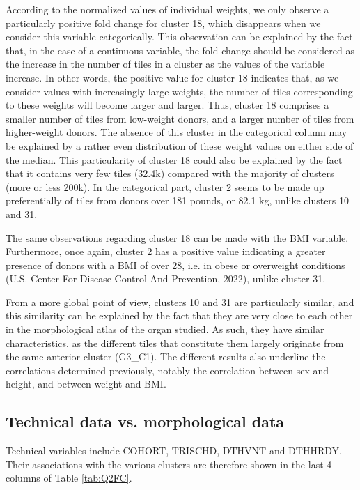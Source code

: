\documentclass[a4paper, 11pt]{article}
\begin{document}
\begin{multicols}{2}
According to the normalized values of individual weights, we only observe a particularly positive fold change for cluster 18, which disappears when we consider this variable categorically. This observation can be explained by the fact that, in the case of a continuous variable, the fold change should be considered as the increase in the number of tiles in a cluster as the values of the variable increase. In other words, the positive value for cluster 18 indicates that, as we consider values with increasingly large weights, the number of tiles corresponding to these weights will become larger and larger. Thus, cluster 18 comprises a smaller number of tiles from low-weight donors, and a larger number of tiles from higher-weight donors. The absence of this cluster in the categorical column may be explained by a rather even distribution of these weight values on either side of the median. This particularity of cluster 18 could also be explained by the fact that it contains very few tiles (32.4k) compared with the majority of clusters (more or less 200k). In the categorical part, cluster 2 seems to be made up preferentially of tiles from donors over 181 pounds, or 82.1 kg, unlike clusters 10 and 31.

The same observations regarding cluster 18 can be made with the BMI variable. Furthermore, once again, cluster 2 has a positive value indicating a greater presence of donors with a BMI of over 28, i.e. in obese or overweight conditions (U.S. Center For Disease Control And Prevention, 2022), unlike cluster 31.

From a more global point of view, clusters 10 and 31 are particularly similar, and this similarity can be explained by the fact that they are very close to each other in the morphological atlas of the organ studied. As such, they have similar characteristics, as the different tiles that constitute them largely originate from the same anterior cluster (G3\_C1). The different results also underline the correlations determined previously, notably the correlation between sex and height, and between weight and BMI.

\subsection{Technical data vs. morphological data}

Technical variables include COHORT, TRISCHD, DTHVNT and DTHHRDY. Their associations with the various clusters are therefore shown in the last 4 columns of Table \ref{tab:Q2FC}. 


\end{multicols}
\end{document}
